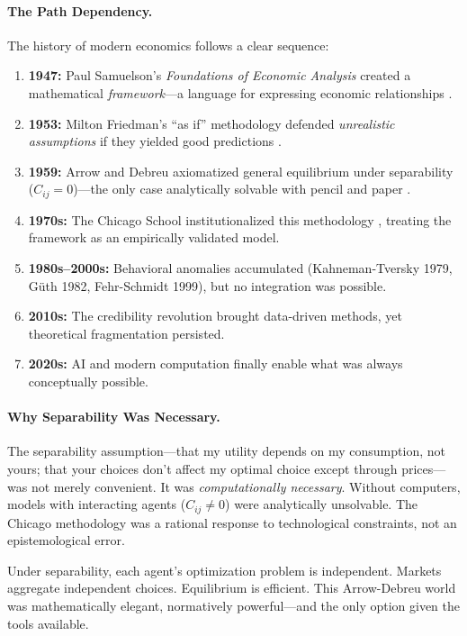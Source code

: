 \paragraph{The Path Dependency.}
The history of modern economics follows a clear sequence:
\begin{enumerate}
    \item \textbf{1947:} Paul Samuelson's \emph{Foundations of Economic Analysis} created a mathematical \emph{framework}---a language for expressing economic relationships \citep{samuelson1947foundations}.
    \item \textbf{1953:} Milton Friedman's ``as if'' methodology defended \emph{unrealistic assumptions} if they yielded good predictions \citep{friedman1953essays}.
    \item \textbf{1959:} Arrow and Debreu axiomatized general equilibrium under separability ($C_{ij} = 0$)---the only case analytically solvable with pencil and paper \citep{arrowdeb}.
    \item \textbf{1970s:} The Chicago School institutionalized this methodology \citep{stigler1982,becker1976economic}, treating the framework as an empirically validated model.
    \item \textbf{1980s--2000s:} Behavioral anomalies accumulated (Kahneman-Tversky 1979, Güth 1982, Fehr-Schmidt 1999), but no integration was possible.
    \item \textbf{2010s:} The credibility revolution \citep{angrist2010,leamer2010tantalus} brought data-driven methods, yet theoretical fragmentation persisted.
    \item \textbf{2020s:} AI and modern computation finally enable what was always conceptually possible.
\end{enumerate}

\paragraph{Why Separability Was Necessary.}
The separability assumption---that my utility depends on my consumption, not yours; that your choices don't affect my optimal choice except through prices---was not merely convenient. It was \emph{computationally necessary}. Without computers, models with interacting agents ($C_{ij} \neq 0$) were analytically unsolvable. The Chicago methodology was a rational response to technological constraints, not an epistemological error.

Under separability, each agent's optimization problem is independent. Markets aggregate independent choices. Equilibrium is efficient. This Arrow-Debreu world was mathematically elegant, normatively powerful---and the only option given the tools available.

